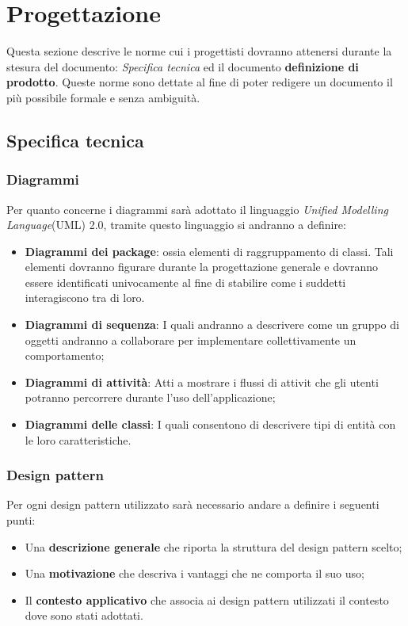 \section{Progettazione}
Questa sezione descrive le norme cui i progettisti dovranno attenersi durante la stesura del documento:  \textit{Specifica tecnica} ed il documento \textbf{definizione di prodotto}. Queste norme sono dettate al fine di poter redigere un documento il più possibile formale e senza ambiguità.

\subsection{Specifica tecnica}
\subsubsection{Diagrammi}
Per quanto concerne i diagrammi sarà adottato il linguaggio \textit{Unified Modelling Language}(UML) 2.0,
tramite questo linguaggio si andranno a definire:
\begin{itemize}
\item \textbf{Diagrammi dei package}: ossia elementi di raggruppamento di classi. Tali elementi dovranno figurare durante la progettazione generale e dovranno essere identificati univocamente al fine di stabilire come i suddetti interagiscono tra di loro.

\item \textbf{Diagrammi di sequenza}: I quali andranno a descrivere come un gruppo di oggetti andranno a collaborare per implementare collettivamente un comportamento;

\item \textbf{Diagrammi di attività}: Atti a mostrare i flussi di attivit che gli utenti potranno percorrere durante l'uso dell'applicazione;

\item \textbf{Diagrammi delle classi}: I quali consentono di descrivere tipi di entità con le loro caratteristiche.
\end{itemize}

\subsubsection{Design pattern}
Per ogni design pattern utilizzato sarà necessario andare a definire i seguenti punti:
\begin{itemize}
\item Una \textbf{descrizione generale} che riporta la struttura del design pattern scelto;
\item Una \textbf{motivazione} che descriva i vantaggi che ne comporta il suo uso;
\item Il \textbf{contesto applicativo} che associa ai design pattern utilizzati il contesto dove sono stati adottati.
\end{itemize}


